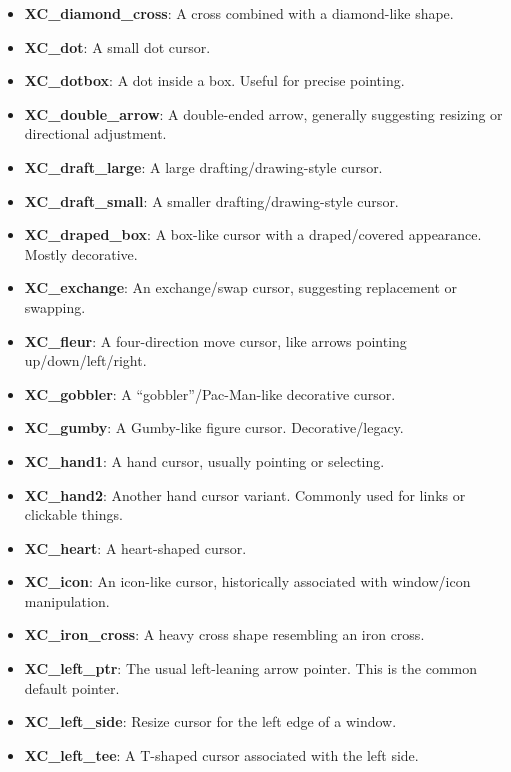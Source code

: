 \documentclass{report}
\begin{document}
\begin{itemize}
\begin{itemize}
                \item \textbf{XC\_diamond\_cross}:	A cross combined with a diamond-like shape.
                \item \textbf{XC\_dot}:	A small dot cursor.
                \item \textbf{XC\_dotbox}:	A dot inside a box. Useful for precise pointing.
                \item \textbf{XC\_double\_arrow}:	A double-ended arrow, generally suggesting resizing or directional adjustment.
                \item \textbf{XC\_draft\_large}:	A large drafting/drawing-style cursor.
                \item \textbf{XC\_draft\_small}:	A smaller drafting/drawing-style cursor.
                \item \textbf{XC\_draped\_box}:	A box-like cursor with a draped/covered appearance. Mostly decorative.
                \item \textbf{XC\_exchange}:	An exchange/swap cursor, suggesting replacement or swapping.
                \item \textbf{XC\_fleur}:	A four-direction move cursor, like arrows pointing up/down/left/right.
                \item \textbf{XC\_gobbler}:	A “gobbler”/Pac-Man-like decorative cursor.
                \item \textbf{XC\_gumby}:	A Gumby-like figure cursor. Decorative/legacy.
                \item \textbf{XC\_hand1}:	A hand cursor, usually pointing or selecting.
                \item \textbf{XC\_hand2}:	Another hand cursor variant. Commonly used for links or clickable things.
                \item \textbf{XC\_heart}:	A heart-shaped cursor.
                \item \textbf{XC\_icon}:	An icon-like cursor, historically associated with window/icon manipulation.
                \item \textbf{XC\_iron\_cross}:	A heavy cross shape resembling an iron cross.
                \item \textbf{XC\_left\_ptr}:	The usual left-leaning arrow pointer. This is the common default pointer.
                \item \textbf{XC\_left\_side}:	Resize cursor for the left edge of a window.
                \item \textbf{XC\_left\_tee}:	A T-shaped cursor associated with the left side.

\end{itemize}
\end{itemize}
\end{document}
